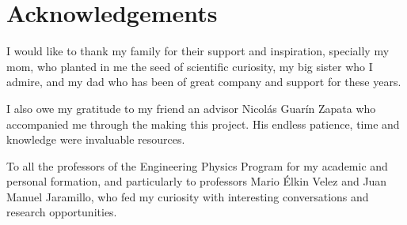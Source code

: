 \chapter{Acknowledgements}

I would like to thank my family for their support and inspiration, specially my mom, who planted in me the seed of scientific curiosity, my big sister who I admire, and my dad who has been of great company and support for these years.

I also owe my gratitude to my friend an advisor Nicolás Guarín Zapata who accompanied me through the making this project. His endless patience, time and knowledge were invaluable resources.

To all the professors of the Engineering Physics Program for my academic and personal formation, and particularly to professors Mario Élkin Velez and Juan Manuel Jaramillo, who fed my curiosity with interesting conversations and research opportunities.